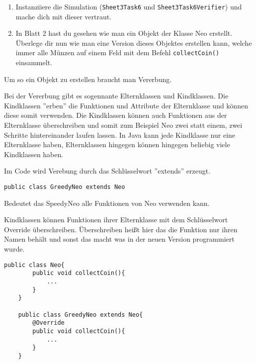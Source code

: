 \begin{enumerate}
	\item 
	Instanziiere die Simulation (\lstinline{Sheet3Task6} und  \lstinline{Sheet3Task6Verifier}) und mache dich mit dieser vertraut.

\item In Blatt 2 hast du gesehen wie man ein Objekt der Klasse Neo erstellt. Überlege dir nun wie man eine Version dieses Objektes erstellen kann, welche immer alle Münzen auf einem Feld mit dem Befehl \lstinline{collectCoin()} einsammelt.
\end{enumerate}
Um so ein Objekt zu erstellen braucht man Vererbung.

\begin{Infobox}[Vererbung]


Bei der Vererbung gibt es sogennante Elternklassen und Kindklassen. Die Kindklassen ''erben'' die Funktionen und Attribute der Elternklasse und können diese somit verwenden. Die Kindklassen können auch Funktionen aus der Elternklasse überschreiben und somit zum Beispiel Neo zwei statt einem, zwei Schritte hintereinander laufen lassen. In Java kann jede Kindklasse nur eine Elternklasse haben, Elternklassen hingegen können hingegen beliebig viele Kindklassen haben.

Im Code wird Verebung durch das Schlüsselwort ''extends'' erzeugt. 
\begin{lstlisting}[xleftmargin=0.5cm]
	public class GreedyNeo extends Neo
		\end{lstlisting}
 Bedeutet das SpeedyNeo alle Funktionen von Neo verwenden kann.

 Kindklassen können Funktionen ihrer Elternklasse mit dem Schlüsselwort Override überschreiben. Überschreiben heißt hier das die Funktion nur ihren Namen behält und sonst das macht was in der neuen Version programmiert wurde.
 \begin{lstlisting}[xleftmargin=0.5cm]
	public class Neo{
		public void collectCoin(){
			...
		}
	}
	
	public class GreedyNeo extends Neo{
		@Override
		public void collectCoin(){
			...
		}
	}
		\end{lstlisting}
\end{Infobox}


